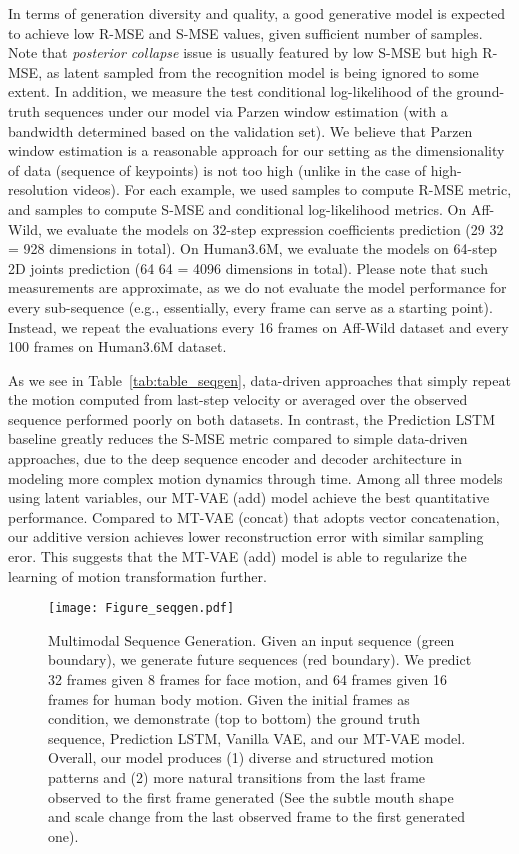\documentclass[runningheads]{llncs}
\begin{document}
In terms of generation diversity and quality, a good generative model is expected to achieve low R-MSE and S-MSE values, given sufficient number of samples.
Note that \textit{posterior collapse} issue is usually featured by low S-MSE but high R-MSE, as latent  sampled from the recognition model is being ignored to some extent.
In addition, we measure the test conditional log-likelihood of the ground-truth sequences under our model via Parzen window estimation (with a bandwidth determined based on the validation set).
We believe that Parzen window estimation is a reasonable approach for our setting as the dimensionality of data (sequence of keypoints) is not too high (unlike in the case of high-resolution videos).
For each example, we used  samples to compute R-MSE metric, and  samples to compute S-MSE and conditional log-likelihood metrics.
On Aff-Wild, we evaluate the models on 32-step expression coefficients prediction (29  32 = 928 dimensions in total).
On Human3.6M, we evaluate the models on 64-step 2D joints prediction (64  64 = 4096 dimensions in total).
Please note that such measurements are approximate, as we do not evaluate the model performance for every sub-sequence (e.g., essentially, every frame can serve as a starting point).
Instead, we repeat the evaluations every 16 frames on Aff-Wild dataset and every 100 frames on Human3.6M dataset.

As we see in Table~\ref{tab:table_seqgen}, data-driven approaches that simply repeat the motion computed from last-step velocity or averaged over the observed sequence performed poorly on both datasets.
In contrast, the Prediction LSTM~\cite{villegas2017learning} baseline greatly reduces the S-MSE metric compared to simple data-driven approaches, due to the deep sequence encoder and decoder architecture in modeling more complex motion dynamics through time.
Among all three models using latent variables, our MT-VAE (add) model achieve the best quantitative performance.
Compared to MT-VAE (concat) that adopts vector concatenation, our additive version achieves lower reconstruction error with similar sampling eror. 
This suggests that the MT-VAE (add) model is able to regularize the learning of motion transformation further.



\begin{figure*}[!h]
\centering
\texttt{[image: Figure\_seqgen.pdf]}
\caption{Multimodal Sequence Generation. 
Given an input sequence (green boundary), we generate future sequences (red boundary).
We predict 32 frames given 8 frames for face motion, and 64 frames given 16 frames for human body motion.
Given the initial frames as condition, we demonstrate (top to bottom) the ground truth sequence, Prediction LSTM, Vanilla VAE, and our MT-VAE model.
Overall, our model produces (1) diverse and structured motion patterns and (2) more natural transitions from the last frame observed to the first frame generated (See the subtle mouth shape and scale change from the last observed frame to the first generated one).
}
\vspace*{-0.2in}
\label{figure:figure_seqgen}
\end{figure*}
\end{document}
